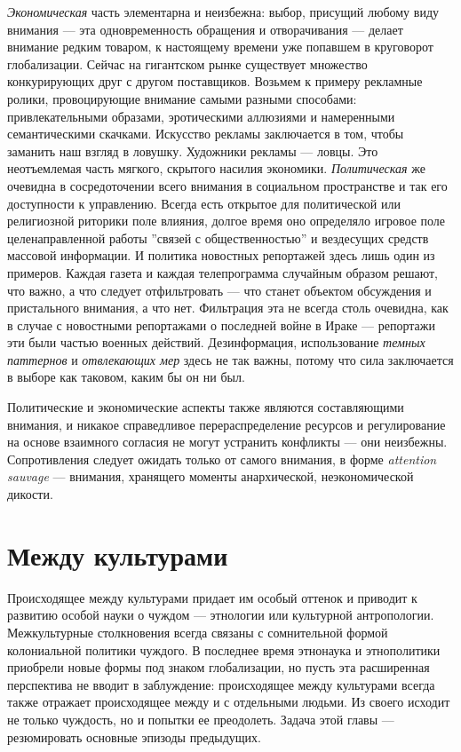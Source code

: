 \documentclass[12pt]{book}
\begin{document}
\textit{Экономическая} часть элементарна и неизбежна: выбор, присущий любому виду внимания --- эта одновременность обращения и отворачивания --- делает внимание редким товаром, к настоящему времени уже попавшем в круговорот глобализации. Сейчас на гигантском рынке существует множество конкурирующих друг с другом поставщиков. Возьмем к примеру рекламные ролики, провоцирующие внимание самыми разными способами: привлекательными образами, эротическими аллюзиями и намеренными семантическими скачками. Искусство рекламы заключается в том, чтобы заманить наш взгляд в ловушку. Художники рекламы --- ловцы. Это неотъемлемая часть мягкого, скрытого насилия экономики. \textit{Политическая} же очевидна в сосредоточении всего внимания в социальном пространстве и так его доступности к управлению. Всегда есть открытое для политической или религиозной риторики поле влияния, долгое время оно определяло игровое поле целенаправленной работы ''связей с общественностью'' и вездесущих средств массовой информации. И политика новостных репортажей здесь лишь один из примеров. Каждая газета и каждая телепрограмма случайным образом решают, что важно, а что следует отфильтровать --- что станет объектом обсуждения и пристального внимания, а что нет. Фильтрация эта не всегда столь очевидна, как в случае с новостными репортажами о последней войне в Ираке --- репортажи эти были частью военных действий. Дезинформация, использование \textit{темных паттернов} и \textit{отвлекающих мер} здесь не так важны, потому что сила заключается в выборе как таковом, каким бы он ни был.

Политические и экономические аспекты также являются составляющими внимания, и никакое справедливое перераспределение ресурсов и регулирование на основе взаимного согласия не могут устранить конфликты --- они неизбежны. Сопротивления следует ожидать только от самого внимания, в форме \textit{attention sauvage} --- внимания, хранящего моменты анархической, неэкономической дикости.

\chapter{Между культурами}

Происходящее между культурами придает им особый оттенок и приводит к развитию особой науки о чуждом --- этнологии или культурной антропологии. Межкультурные столкновения всегда связаны с сомнительной формой колониальной политики чуждого. В последнее время этнонаука и этнополитики приобрели новые формы под знаком глобализации, но пусть эта расширенная перспектива не вводит в заблуждение: происходящее между культурами всегда также отражает происходящее между и с отдельными людьми. Из своего исходит не только чуждость, но и попытки ее преодолеть. Задача этой главы --- резюмировать основные эпизоды предыдущих.
\end{document}
